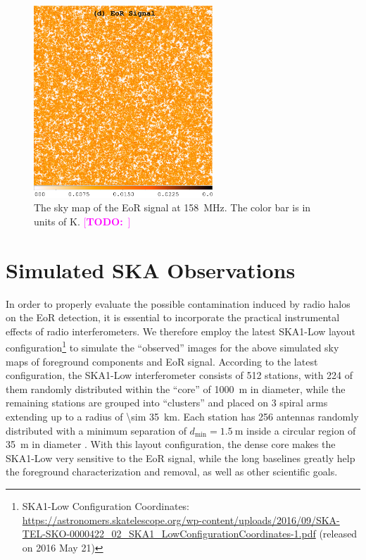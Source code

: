 \documentclass[modern]{aastex62}
\newcommand{\R}[1]{\mathrm{#1}}
\newcommand{\TODO}[1]{\textcolor{magenta}{[\textbf{TODO:}~\uuline{#1}]}}
\begin{document}
\begin{figure}
  \centering
  \includegraphics[width=0.6\textwidth]{21cm-f158-heat}
  \caption{\label{fig:map-eor}%
    The sky map of the EoR signal at \SI{158}{\MHz}.
    The color bar is in units of \si{\kelvin}.
    \TODO{update map}
  }
\end{figure}


\section{Simulated SKA Observations}
\label{sec:obs-simu}

In order to properly evaluate the possible contamination induced by radio
halos on the EoR detection, it is essential to incorporate the practical
instrumental effects of radio interferometers.
We therefore employ the latest SKA1-Low layout configuration\footnote{%
  SKA1-Low Configuration Coordinates:
  \url{https://astronomers.skatelescope.org/wp-content/uploads/2016/09/SKA-TEL-SKO-0000422_02_SKA1_LowConfigurationCoordinates-1.pdf}
  (released on 2016 May 21)
}
to simulate the \enquote{observed} images for the above simulated sky
maps of foreground components and EoR signal.
According to the latest configuration,
the SKA1-Low interferometer consists of 512 stations, with 224 of them
randomly distributed within the \enquote{core} of \SI{1000}{\meter} in
diameter, while the remaining stations are grouped into \enquote{clusters}
and placed on 3 spiral arms extending up to a radius of
\SI{\sim 35}{\kilo\meter}.
Each station has 256 antennas randomly distributed with a minimum separation
of $d_{\R{min}} = \SI{1.5}{\meter}$ inside a circular region of
\SI{35}{\meter} in diameter \citep[e.g.,][]{mort2017}.
With this layout configuration, the dense core makes the SKA1-Low very
sensitive to the EoR signal, while the long baselines greatly help the
foreground characterization and removal, as well as other scientific goals.
\end{document}
